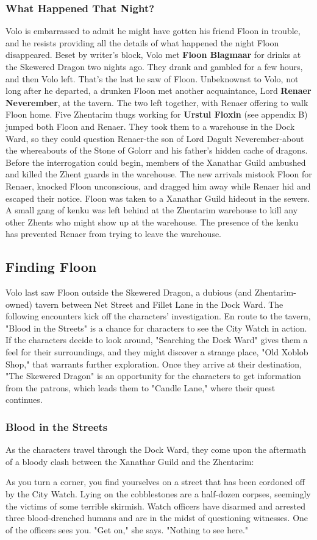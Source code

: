 \documentclass[10pt,a4paper,twoside,twocolumn,openany,nodeprecatedcode]{dndbook}
\begin{document}
\subsubsection{What Happened That Night?}
Volo is embarrassed to admit he might have gotten his friend Floon in trouble, and he resists providing all the details of what happened the night Floon disappeared.
Beset by writer's block, Volo met \textbf{Floon Blagmaar} for drinks at the Skewered Dragon two nights ago. They drank and gambled for a few hours, and then Volo left. That's the last he saw of Floon.
Unbeknownst to Volo, not long after he departed, a drunken Floon met another acquaintance, Lord \textbf{Renaer Neverember}, at the tavern. The two left together, with Renaer offering to walk Floon home. Five Zhentarim thugs working for \textbf{Urstul Floxin} (see appendix B) jumped both Floon and Renaer. They took them to a warehouse in the Dock Ward, so they could question Renaer-the son of Lord Dagult Neverember-about the whereabouts of the Stone of Golorr and his father's hidden cache of dragons. Before the interrogation could begin, members of the Xanathar Guild ambushed and killed the Zhent guards in the warehouse. The new arrivals mistook Floon for Renaer, knocked Floon unconscious, and dragged him away while Renaer hid and escaped their notice.
Floon was taken to a Xanathar Guild hideout in the sewers. A small gang of kenku was left behind at the Zhentarim warehouse to kill any other Zhents who might show up at the warehouse. The presence of the kenku has prevented Renaer from trying to leave the warehouse.
\subsection{Finding Floon}
Volo last saw Floon outside the Skewered Dragon, a dubious (and Zhentarim-owned) tavern between Net Street and Fillet Lane in the Dock Ward. The following encounters kick off the characters' investigation.
En route to the tavern, "Blood in the Streets" is a chance for characters to see the City Watch in action. If the characters decide to look around, "Searching the Dock Ward" gives them a feel for their surroundings, and they might discover a strange place, "Old Xoblob Shop," that warrants further exploration. Once they arrive at their destination, "The Skewered Dragon" is an opportunity for the characters to get information from the patrons, which leads them to "Candle Lane," where their quest continues.
\subsubsection{Blood in the Streets}
As the characters travel through the Dock Ward, they come upon the aftermath of a bloody clash between the Xanathar Guild and the Zhentarim:
\begin{DndReadAloud}{}
As you turn a corner, you find yourselves on a street that has been cordoned off by the City Watch. Lying on the cobblestones are a half-dozen corpses, seemingly the victims of some terrible skirmish. Watch officers have disarmed and arrested three blood-drenched humans and are in the midst of questioning witnesses. One of the officers sees you. "Get on," she says. "Nothing to see here."
\end{DndReadAloud}
\end{document}
